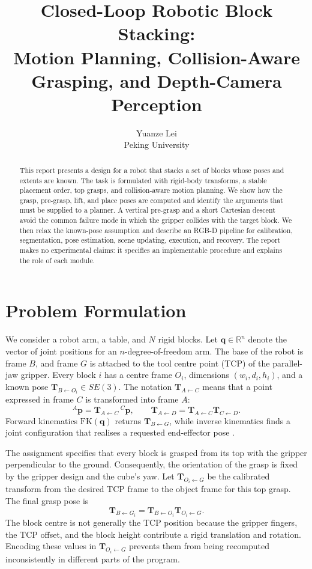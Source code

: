\documentclass{article}
\title{Closed-Loop Robotic Block Stacking:\\
Motion Planning, Collision-Aware Grasping, and Depth-Camera Perception}
\author{%
  Yuanze Lei \quad 2510124204\\
  Peking University
}
\begin{document}
\maketitle

\begin{abstract}
This report presents a design for a robot that stacks a set of blocks whose poses
and extents are known. The task is formulated with rigid-body transforms, a
stable placement order, top grasps, and collision-aware motion planning. We show
how the grasp, pre-grasp, lift, and place poses are computed and identify the
arguments that must be supplied to a planner. A vertical pre-grasp and a
short Cartesian descent avoid the common failure mode in which the gripper
collides with the target block. We then relax the known-pose assumption and
describe an RGB-D pipeline for calibration, segmentation, pose estimation, scene
updating, execution, and recovery. The report makes no experimental claims: it
specifies an implementable procedure and explains the role of each module.
\end{abstract}

\section{Problem Formulation}\label{sec:problem}

We consider a robot arm, a table, and $N$ rigid blocks. Let
$\mathbf{q}\in\mathbb{R}^{n}$ denote the vector of joint positions for an
$n$-degree-of-freedom arm. The base of the robot is frame $B$, and frame $G$
is attached to the tool centre point (TCP) of the parallel-jaw gripper. Every
block $i$ has a centre frame $O_i$, dimensions $(w_i,d_i,h_i)$, and a known pose
$\mathbf{T}_{B\leftarrow O_i}\in SE(3)$. The notation
$\mathbf{T}_{A\leftarrow C}$ means that a point expressed in frame $C$ is
transformed into frame $A$:
\begin{equation}\label{eq:transform}
  {}^{A}\mathbf{p}
  =
  \mathbf{T}_{A\leftarrow C}\,{}^{C}\mathbf{p},
  \qquad
  \mathbf{T}_{A\leftarrow D}
  =
  \mathbf{T}_{A\leftarrow C}\mathbf{T}_{C\leftarrow D}.
\end{equation}
Forward kinematics $\mathrm{FK}(\mathbf{q})$ returns
$\mathbf{T}_{B\leftarrow G}$, while inverse kinematics finds a joint
configuration that realises a requested end-effector pose
\citep{lynch2017modern}.

The assignment specifies that every block is grasped from its top with the
gripper perpendicular to the ground. Consequently, the orientation of the grasp
is fixed by the gripper design and the cube's yaw. Let
$\mathbf{T}_{O_i\leftarrow G}$ be the calibrated transform from the desired TCP
frame to the object frame for this top grasp. The final grasp pose is
\begin{equation}\label{eq:grasp}
  \mathbf{T}_{B\leftarrow G_i}
  =
  \mathbf{T}_{B\leftarrow O_i}
  \mathbf{T}_{O_i\leftarrow G}.
\end{equation}
The block centre is not generally the TCP position because the gripper fingers,
the TCP offset, and the block height contribute a rigid translation and
rotation. Encoding these values in $\mathbf{T}_{O_i\leftarrow G}$ prevents them
from being recomputed inconsistently in different parts of the program.
\end{document}
